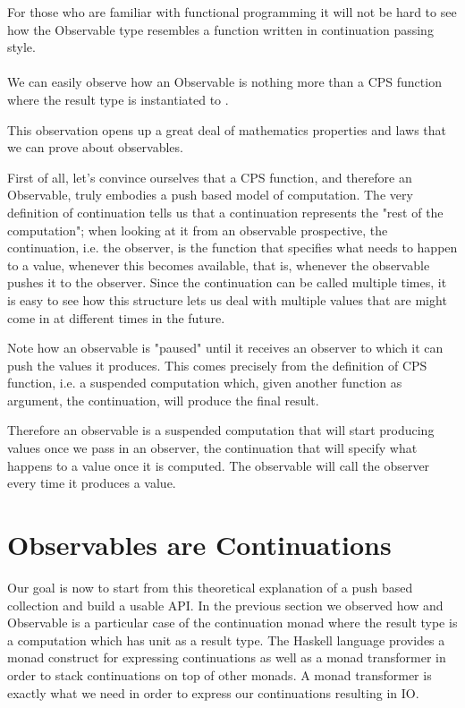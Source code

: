 For those who are familiar with functional programming it will not be hard to see how the Observable type resembles a function written in continuation passing style.\\

\\

We can easily observe how an Observable is nothing more than a CPS function where the result type  is instantiated to .

This observation opens up a great deal of mathematics properties and laws that we can prove about observables.

First of all, let's convince ourselves that a CPS function, and therefore an Observable, truly embodies a push based model of computation. The very definition of continuation tells us that a continuation represents the "rest of the computation"; when looking at it from an observable prospective, the continuation, i.e. the observer, is the function that specifies what needs to happen to a value, whenever this becomes available, that is, whenever the observable pushes it to the observer. Since the continuation can be called multiple times, it is easy to see how this structure lets us deal with multiple values that are might come in at different times in the future.

Note how an observable is "paused" until it receives an observer to which it can push the values it produces. This comes precisely from the definition of CPS function, i.e. a suspended computation which, given another function as argument, the continuation, will produce the final result.  

Therefore an observable is a suspended computation that will start producing values once we pass in an observer, the continuation that will specify what happens to a value once it is computed. The observable will call the observer every time it produces a value.

\section{Observables are Continuations}


Our goal is now to start from this theoretical explanation of a push based collection and build a usable API. In the previous section we observed how and Observable is a particular case of the continuation monad where the result type is a computation which has unit as a result type. The Haskell language provides a monad construct for expressing continuations as well as a monad transformer in order to stack continuations on top of other monads. A monad transformer is exactly what we need in order to express our continuations resulting in IO.\\

